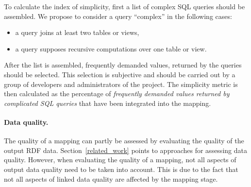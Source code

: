 To calculate the index of simplicity, first a list of complex SQL queries should be assembled.
We propose to consider a query “complex” in the following cases:
\begin{itemize}
\item a query joins at least two tables or views,
\item a query supposes recursive computations over one table or view.
\end{itemize}
After the list is assembled, frequently demanded values, returned by the queries should be selected.
This selection is subjective and should be carried out by a group of developers and administrators of the project.
The simplicity metric is then calculated as the percentage of \emph{frequently demanded values returned by complicated SQL queries} that have been integrated into the mapping. 

\paragraph{Data quality.}
\label{data_quality_par}
The quality of a mapping can partly be assessed by evaluating the quality of the output RDF data.
Section~\ref{related_work} points to approaches for assessing data quality.
However, when evaluating the quality of a mapping, not all aspects of output data quality need to be taken into account.
This is due to the fact that not all aspects of linked data quality are affected by the mapping stage.

